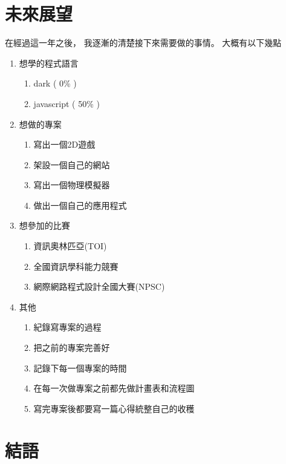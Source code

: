 \documentclass[12pt,oneside]{ctexart}
\begin{document}
\section{未來展望}
\noindent 在經過這一年之後，
我逐漸的清楚接下來需要做的事情。
大概有以下幾點
\renewcommand{\labelenumii}{\alph{enumii}.}
\begin{enumerate}
    \item 想學的程式語言 
    \begin{enumerate}
        \item dark       ( 0\% ) 
        \item javascript ( 50\% )
    \end{enumerate}

    \item 想做的專案
    \begin{enumerate}
        \item 寫出一個2D遊戲
        \item 架設一個自己的網站
        \item 寫出一個物理模擬器
        \item 做出一個自己的應用程式
    \end{enumerate}

    \item 想參加的比賽
    \begin{enumerate}
        \item 資訊奧林匹亞(TOI)
        \item 全國資訊學科能力競賽
        \item 網際網路程式設計全國大賽(NPSC)
    \end{enumerate}

    \item 其他
    \begin{enumerate}
        \item 紀錄寫專案的過程
        \item 把之前的專案完善好
        \item 記錄下每一個專案的時間
        \item 在每一次做專案之前都先做計畫表和流程圖
        \item 寫完專案後都要寫一篇心得統整自己的收穫
    \end{enumerate}

\end{enumerate}

\clearpage
\section{結語}
\end{document}
